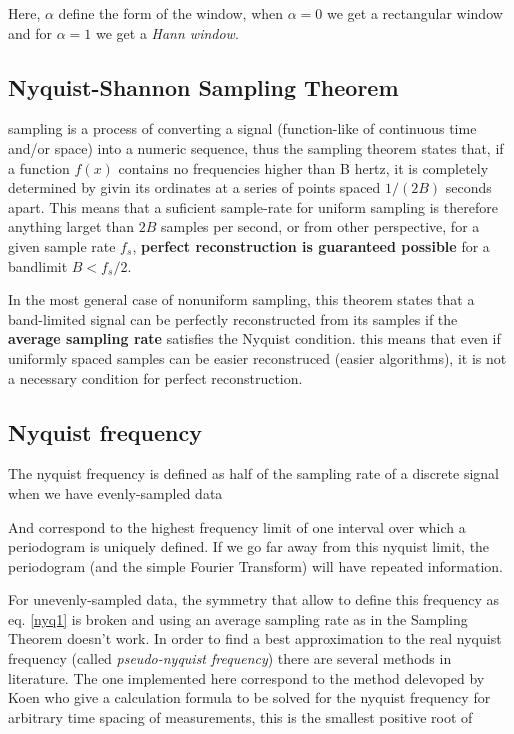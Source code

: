 \newp Here, $\alpha$ define the form of the window, when $\alpha=0$ we get a rectangular window and for $\alpha=1$ we get a \textit{Hann window}.
\subsection{Nyquist-Shannon Sampling Theorem}{\label{subsec_NSST}}
\newp sampling is a process of converting a signal (function-like of continuous time and/or space) into a numeric sequence, thus the sampling theorem states that, if a function $f(x)$ contains no frequencies higher than B hertz, it is completely determined by givin its ordinates at a series of points spaced $1/(2B)$ seconds apart. This means that a suficient sample-rate for uniform sampling is therefore anything larget than $2B$ samples per second, or from other perspective, for a given sample rate $f_s$, \textbf{perfect reconstruction is guaranteed possible} for a bandlimit $B < f_s/2$.

\newp In the most general case of nonuniform sampling, this theorem states that a band-limited signal can be perfectly reconstructed from its samples if the \textbf{average sampling rate} satisfies the Nyquist condition. this means that even if uniformly spaced samples can be easier reconstruced (easier algorithms), it is not a necessary condition for perfect reconstruction.

\subsection{Nyquist frequency}{\label{subsec_nyqfreq}}
\newp The nyquist frequency is defined as half of the sampling rate  of a discrete signal when we have evenly-sampled data

\insertequation[\label{nyq1}]{\nu_N = 0.5 f_s}

\newp And correspond to the highest frequency limit of one interval over which a periodogram is uniquely defined. If we go far away from this nyquist limit, the periodogram (and the simple Fourier Transform) will have repeated information. 

\newp For unevenly-sampled data, the symmetry that allow to define this frequency as eq. \ref{nyq1} is broken and using an average sampling rate as in the Sampling Theorem doesn't work. In order to find a best approximation to the real nyquist frequency (called \textit{pseudo-nyquist frequency}) there are several methods in literature. The one implemented here correspond to the method delevoped by Koen who give a calculation formula to be solved for the nyquist frequency for arbitrary time spacing of measurements, this is the smallest positive root of

